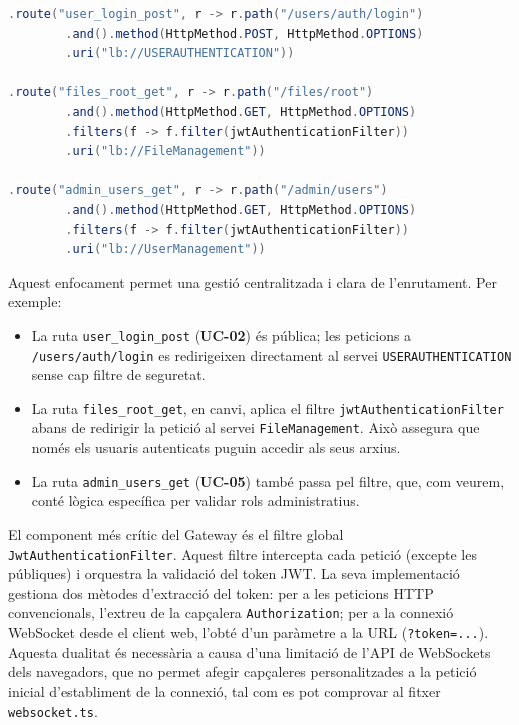 \begin{lstlisting}[language=Java, caption={Exemples de definició de rutes a `GatewayConfig`}]
.route("user_login_post", r -> r.path("/users/auth/login")
        .and().method(HttpMethod.POST, HttpMethod.OPTIONS)
        .uri("lb://USERAUTHENTICATION"))

.route("files_root_get", r -> r.path("/files/root")
        .and().method(HttpMethod.GET, HttpMethod.OPTIONS)
        .filters(f -> f.filter(jwtAuthenticationFilter))
        .uri("lb://FileManagement"))
        
.route("admin_users_get", r -> r.path("/admin/users")
        .and().method(HttpMethod.GET, HttpMethod.OPTIONS)
        .filters(f -> f.filter(jwtAuthenticationFilter))
        .uri("lb://UserManagement"))
\end{lstlisting}

Aquest enfocament permet una gestió centralitzada i clara de l'enrutament. Per exemple:
\begin{itemize}
    \item La ruta \texttt{user\_login\_post} (\textbf{UC-02}) és pública; les peticions a \texttt{/users/auth/login} es redirigeixen directament al servei \texttt{USERAUTHENTICATION} sense cap filtre de seguretat.
    \item La ruta \texttt{files\_root\_get}, en canvi, aplica el filtre \texttt{jwtAuthenticationFilter} abans de redirigir la petició al servei \texttt{FileManagement}. Això assegura que només els usuaris autenticats puguin accedir als seus arxius.
    \item La ruta \texttt{admin\_users\_get} (\textbf{UC-05}) també passa pel filtre, que, com veurem, conté lògica específica per validar rols administratius.
\end{itemize}

El component més crític del Gateway és el filtre global \texttt{JwtAuthenticationFilter}. Aquest filtre intercepta cada petició (excepte les públiques) i orquestra la validació del token JWT. La seva implementació gestiona dos mètodes d'extracció del token: per a les peticions HTTP convencionals, l'extreu de la capçalera \texttt{Authorization}; per a la connexió WebSocket desde el client web, l'obté d'un paràmetre a la URL (\texttt{?token=...}). Aquesta dualitat és necessària a causa d'una limitació de l'API de WebSockets dels navegadors, que no permet afegir capçaleres personalitzades a la petició inicial d'establiment de la connexió, tal com es pot comprovar al fitxer \texttt{websocket.ts}.

